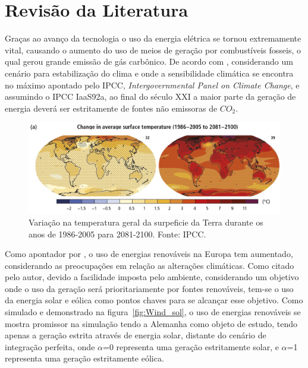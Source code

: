 \chapter{Revisão da Literatura}
\label{cap:02}
Graças ao avanço da tecnologia o uso da energia elétrica se tornou extremamente vital, causando o aumento do uso de meios de geração por combustíveis fosseis, o qual gerou grande emissão de gás carbônico. De acordo com , considerando um cenário para estabilização do clima e onde a sensibilidade climática se encontra no máximo apontado pelo IPCC, \textit{Intergovernmental Panel on Climate Change}, e assumindo o IPCC IaaS92a, ao final do século XXI a maior parte da geração de energia deverá ser estritamente de fontes não emissoras de $CO_{2}$.

\FloatBarrier
\begin{figure}[htbp]
	\centering
	\includegraphics[scale=1.]{imagens/Temp_IPCC}
	\caption{Variação na temperatura geral da surpeficie da Terra durante os anos de 1986-2005 para 2081-2100. Fonte: IPCC. }
	
	\label{fig:TempE}
\end{figure}
\FloatBarrier


Como apontador por , o uso de energias renováveis na Europa tem aumentado, considerando as preocupações em relação as alterações climáticas. Como citado pelo autor, devido a facilidade imposta pelo ambiente, considerando um objetivo onde o uso da geração será prioritariamente por fontes renováveis, tem-se o uso da energia solar e eólica como pontos chaves para se alcançar esse objetivo. Como simulado e demonstrado na figura~\ref{fig:Wind_sol}, o uso de energias renováveis se mostra promissor na simulação tendo a Alemanha como objeto de estudo, tendo apenas a geração estrita através de energia solar, distante do cenário de integração perfeita, onde $\alpha$=0 representa uma geração estritamente solar, e $\alpha$=1 representa uma geração estritamente eólica.

